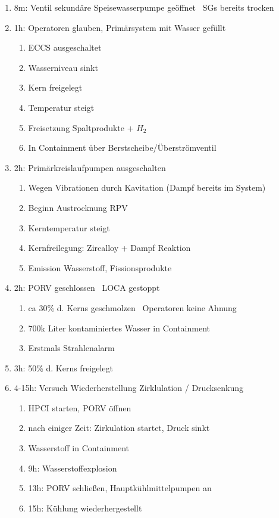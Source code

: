 \documentclass[12pt]{article}
\begin{document}
\begin{enumerate}
\begin{enumerate}[label = \textrightarrow]
		\end{enumerate}
	\item 8m: Ventil sekundäre Speisewasserpumpe geöffnet \textrightarrow\ SGs bereits trocken
	\item 1h: Operatoren glauben, Primärsystem mit Wasser gefüllt
		\begin{enumerate}[label = \textrightarrow]
			\item ECCS ausgeschaltet
			\item Wasserniveau sinkt
			\item Kern freigelegt
			\item Temperatur steigt
			\item Freisetzung Spaltprodukte + \(H_2\)
			\item In Containment über Berstscheibe/Überströmventil
		\end{enumerate}
	\item 2h: Primärkreislaufpumpen ausgeschalten
		\begin{enumerate}[label = \textrightarrow]
			\item Wegen Vibrationen durch Kavitation (Dampf bereits im System)
			\item Beginn Austrocknung RPV
			\item Kerntemperatur steigt
			\item Kernfreilegung: Zircalloy + Dampf Reaktion
			\item Emission Wasserstoff, Fissionsprodukte
		\end{enumerate}
	\item 2h: PORV geschlossen \textrightarrow\ LOCA gestoppt
		\begin{enumerate}[label = \textrightarrow]
			\item ca 30\% d. Kerns geschmolzen \textrightarrow\ Operatoren keine Ahnung
			\item 700k Liter kontaminiertes Wasser in Containment
			\item Erstmals Strahlenalarm
		\end{enumerate}
	\item 3h: 50\% d. Kerns freigelegt
	\item 4-15h: Versuch Wiederherstellung Zirklulation / Drucksenkung
		\begin{enumerate}[label = \textrightarrow]
			\item HPCI starten, PORV öffnen
			\item nach einiger Zeit: Zirkulation startet, Druck sinkt
			\item Wasserstoff in Containment
			\item 9h: Wasserstoffexplosion
			\item 13h: PORV schließen, Hauptkühlmittelpumpen an
			\item 15h: Kühlung wiederhergestellt
		\end{enumerate}
\end{enumerate}
\end{document}
